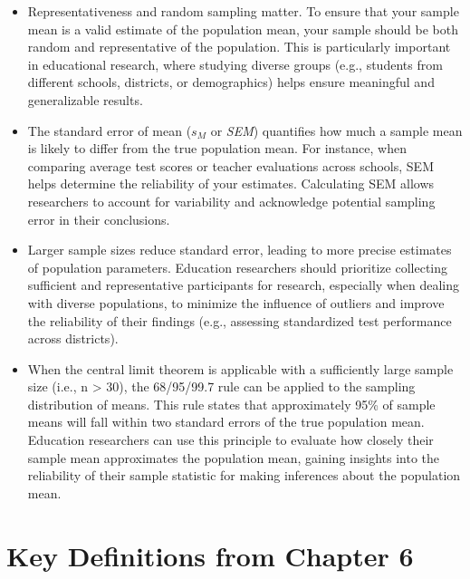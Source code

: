 \documentclass[
  letterpaper,
  DIV=11,
  numbers=noendperiod]{scrreprt}
\begin{document}

\begin{itemize}
\item
  Representativeness and random sampling matter. To ensure that your
  sample mean is a valid estimate of the population mean, your sample
  should be both random and representative of the population. This is
  particularly important in educational research, where studying diverse
  groups (e.g., students from different schools, districts, or
  demographics) helps ensure meaningful and generalizable results.
\item
  The standard error of mean (\(s_M\) or \emph{SEM}) quantifies how much
  a sample mean is likely to differ from the true population mean. For
  instance, when comparing average test scores or teacher evaluations
  across schools, SEM helps determine the reliability of your estimates.
  Calculating SEM allows researchers to account for variability and
  acknowledge potential sampling error in their conclusions.
\item
  Larger sample sizes reduce standard error, leading to more precise
  estimates of population parameters. Education researchers should
  prioritize collecting sufficient and representative participants for
  research, especially when dealing with diverse populations, to
  minimize the influence of outliers and improve the reliability of
  their findings (e.g., assessing standardized test performance across
  districts).
\item
  When the central limit theorem is applicable with a sufficiently large
  sample size (i.e., n \textgreater{} 30), the 68/95/99.7 rule can be
  applied to the sampling distribution of means. This rule states that
  approximately 95\% of sample means will fall within two standard
  errors of the true population mean. Education researchers can use this
  principle to evaluate how closely their sample mean approximates the
  population mean, gaining insights into the reliability of their sample
  statistic for making inferences about the population mean.
\end{itemize}

\section*{Key Definitions from Chapter
6\,}\label{key-definitions-from-chapter-6}
\end{document}
